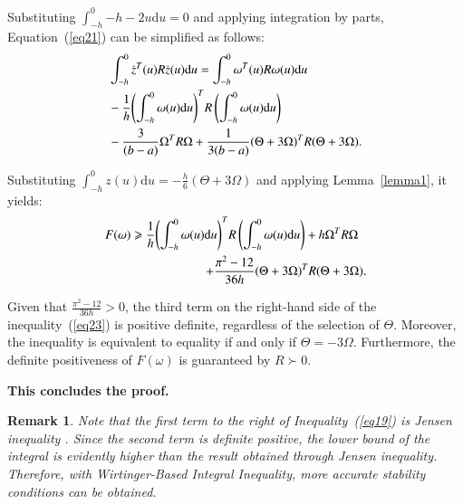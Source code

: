 \documentclass[journal]{IEEEtran}
\newtheorem{remark}[theorem]{Remark}
\begin{document}
\begin{IEEEproof}
  Substituting $ \int_{ - h}^0 { - h - 2u{\text{d}}u}  = 0 $ and applying integration by parts, Equation~(\ref{eq21}) can be simplified as follows:
  \begin{equation}
    \begin{aligned}
      &\int_{ - h}^0 {{{\dot z}^T}(u)R\dot z(u){\text{d}}u}  = \int_{ - h}^0 {{\omega ^T}(u)R\omega (u){\text{d}}u} \\
       &- \frac{1}{h}{\left( {\int_{ - h}^0 {\omega (u){\text{d}}u} } \right)^T}R\left( {\int_{ - h}^0 {\omega (u){\text{d}}u} } \right) \hfill \\
      &- \frac{3}{{(b - a)}}{\Omega ^T}R\Omega  + \frac{1}{{3(b - a)}}{(\Theta  + 3\Omega )^T}R(\Theta  + 3\Omega ). \hfill \\
    \end{aligned}
    \label{eq22}
  \end{equation}

  Substituting $ \int_{ - h}^0 z (u){\text{d}}u =  - \frac{h}{6}(\Theta  + 3\Omega ) $ and applying Lemma~\ref{lemma1}, it yields:
  \begin{equation}
    \begin{gathered}
      F(\omega ) \geqslant \frac{1}{h}{\left( {\int_{ - h}^0 {\omega (u){\text{d}}u} } \right)^T}R\left( {\int_{ - h}^0 {\omega (u){\text{d}}u} } \right) + h{\Omega ^T}R\Omega  \hfill \\
      \quad \quad \quad \quad \quad \quad \quad \quad  + \frac{{{\pi ^2} - 12}}{{36h}}{(\Theta  + 3\Omega )^T}R(\Theta  + 3\Omega ). \hfill \\
    \end{gathered}
    \label{eq23}
  \end{equation}

  Given that $ \frac{{{\pi ^2} - 12}}{{36h}} > 0 $, the third term on the right-hand side of the inequality~(\ref{eq23}) is positive definite, regardless of the selection of $ \Theta $. Moreover, the inequality is equivalent to equality if and only if $ \Theta  =  - 3\Omega  $. Furthermore, the definite positiveness of $ F(\omega ) $ is guaranteed by $ R \succ 0 $. 
  
\textbf{This concludes the proof.}

\end{IEEEproof}

\begin{remark}
  \label{remarkXX}
  Note that the first term to the right of Inequality~(\ref{eq19}) is Jensen inequality \citep{Gu2003}. Since the second term is definite positive, the lower bound of the integral is evidently higher than the result obtained through Jensen inequality. Therefore, with Wirtinger-Based Integral Inequality, more accurate stability conditions can be obtained.
\end{remark}
\end{document}

